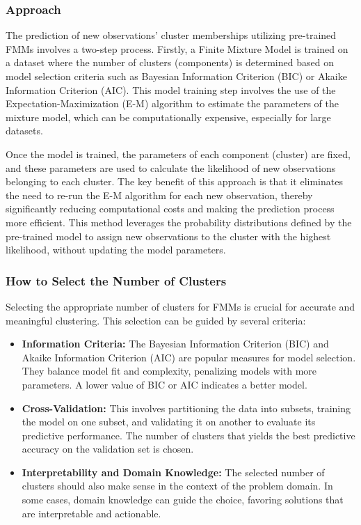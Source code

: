 \documentclass{article}
\begin{document}
\subsubsection*{Approach}

The prediction of new observations' cluster memberships utilizing pre-trained FMMs involves a two-step process. Firstly, a Finite Mixture Model is trained on a dataset where the number of clusters (components) is determined based on model selection criteria such as Bayesian Information Criterion (BIC) or Akaike Information Criterion (AIC). This model training step involves the use of the Expectation-Maximization (E-M) algorithm to estimate the parameters of the mixture model, which can be computationally expensive, especially for large datasets.

Once the model is trained, the parameters of each component (cluster) are fixed, and these parameters are used to calculate the likelihood of new observations belonging to each cluster. The key benefit of this approach is that it eliminates the need to re-run the E-M algorithm for each new observation, thereby significantly reducing computational costs and making the prediction process more efficient. This method leverages the probability distributions defined by the pre-trained model to assign new observations to the cluster with the highest likelihood, without updating the model parameters.

\subsubsection*{How to Select the Number of Clusters}

Selecting the appropriate number of clusters for FMMs is crucial for accurate and meaningful clustering. This selection can be guided by several criteria:

\begin{itemize}
    \item \textbf{Information Criteria:} The Bayesian Information Criterion (BIC) and Akaike Information Criterion (AIC) are popular measures for model selection. They balance model fit and complexity, penalizing models with more parameters. A lower value of BIC or AIC indicates a better model.
    \item \textbf{Cross-Validation:} This involves partitioning the data into subsets, training the model on one subset, and validating it on another to evaluate its predictive performance. The number of clusters that yields the best predictive accuracy on the validation set is chosen.
    \item \textbf{Interpretability and Domain Knowledge:} The selected number of clusters should also make sense in the context of the problem domain. In some cases, domain knowledge can guide the choice, favoring solutions that are interpretable and actionable.
\end{itemize}
\end{document}
